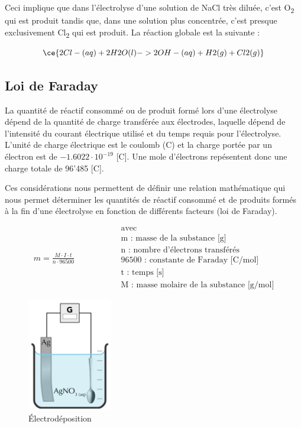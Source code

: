 \documentclass[
  11pt,
  a4paper,
  openany]{book}
\begin{document}
Ceci implique que dans l'électrolyse d'une solution de NaCl très diluée, c'est O\textsubscript{2} qui est produit tandis que, dans une solution plus concentrée, c'est presque exclusivement Cl\textsubscript{2} qui est produit. La réaction globale est la suivante :

\[
\ce{2 Cl-(aq) + 2 H2O(l) -> 2 OH-(aq) + H2(g) + Cl2(g)}
\]

\clearpage

\hypertarget{loi-de-faraday}{%
\subsection{Loi de Faraday}\label{loi-de-faraday}}

La quantité de réactif consommé ou de produit formé lors d'une électrolyse dépend de la quantité de charge transférée aux électrodes, laquelle dépend de l'intensité du courant électrique utilisé et du temps requis pour l'électrolyse. L'unité de charge électrique est le coulomb (C) et la charge portée par un électron est de \(-1.6022 \cdot 10^{-19}\) {[}C{]}. Une mole d'électrons repésentent donc une charge totale de 96'485 {[}C{]}.

Ces considérations nous permettent de définir une relation mathématique qui nous permet déterminer les quantités de réactif consommé et de produits formés à la fin d'une électrolyse en fonction de différents facteurs (loi de Faraday).

\[
\begin{split}
m = \frac{M \cdot I \cdot t}{n \cdot 96500}
\end{split}
\qquad\qquad
\begin{split}
&\text{avec} \\
&\text{m : masse de la substance [g]} \\
&\text{n : nombre d'électrons transférés} \\
&\text{96500 : constante de Faraday [C/mol]} \\
&\text{t : temps [s]} \\
&\text{M : masse molaire de la substance [g/mol]}
\end{split}
\]

\clearpage

\begin{figure}
\centering
\includegraphics[width=10em,height=\textheight]{images/electrolysis-spoon.png}
\caption{Électrodéposition}
\end{figure}
\end{document}
